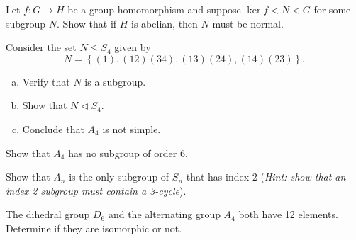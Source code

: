 \documentclass{problemset}
\begin{document}
\begin{exercise} Let \(f: G \rightarrow H\) be a group homomorphism and  suppose \(\ker f < N < G\) for some subgroup \(N\). Show that if \(H\) is abelian, then \(N\) must be normal.
\end{exercise}



\begin{exercise} Consider the set \(N \leq S_4\) given by 
\[N=\left\{ (1), (12)(34), (13)(24), (14)(23)\right\}.\]
\begin{enumerate}[(a)]
\item Verify that \(N\) is a subgroup.
\item Show that \(N \lhd S_4\).
\item Conclude that \(A_4\) is not simple.
\end{enumerate}
\end{exercise}


\begin{exercise}
Show that \(A_4\) has no subgroup of order 6.
\end{exercise}



\begin{exercise}
Show that \(A_n\) is the only subgroup of \(S_n\) that has index 2 (\textit{Hint: show that an index 2 subgroup must contain a 3-cycle}).
\end{exercise}


\begin{exercise} The dihedral group \(D_6\) and the alternating group \(A_4\) both have 12 elements.  Determine if they are isomorphic or not.
\end{exercise}






\end{document}
